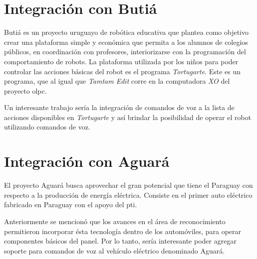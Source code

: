 \section{Integraci\'on con Buti\'a}

Buti\'a es un proyecto uruguayo de rob\'otica educativa \cite{RoboticaEducativa} que plantea como objetivo crear una plataforma simple y econ\'omica que 
permita a los alumnos de colegios p\'ublicos,
en coordinaci\'on con profesores, interiorizarse con la programaci\'on del comportamiento de robots\cite{Butia}. La plataforma
utilizada por los ni\~nos para poder controlar las acciones b\'asicas del robot es el programa \emph{Tortugarte}. Este es un
programa, que al igual que \emph{Tamtam Edit} corre en la computadora \emph{XO} del proyecto \gls{olpc}.

Un interesante trabajo ser\'ia la integraci\'on de comandos de voz a la lista de acciones disponibles 
en \emph{Tortugarte} y as\'i brindar la posibilidad de operar el robot utilizando comandos de voz.

\section{Integraci\'on con Aguar\'a}

El proyecto Aguar\'a busca aprovechar el gran potencial que tiene el Paraguay con respecto a la producci\'on de
energ\'ia el\'ectrica. Consiste en el primer auto el\'ectrico fabricado en Paraguay con el apoyo del \gls{pti}. 

Anteriormente se mencion\'o que los avances en el \'area de reconocimiento
permitieron incorporar \'esta tecnolog\'ia dentro de los autom\'oviles, para operar componentes b\'asicos del panel. Por lo tanto,
ser\'ia interesante poder agregar soporte para comandos de voz al veh\'iculo el\'ectrico denominado Aguar\'a.